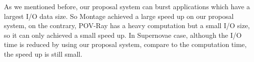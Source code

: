  As we mentioned before, our proposal system can burst applications which have a largest I/O data
 size.
 So Montage achieved a large speed up on our proposal system, on the contrary, POV-Ray has a heavy
 computation but a small I/O size, so it can only achieved a small speed up.
 In Supernovae case, although the I/O time is reduced by using our proposal system, compare to the
 computation time, the speed up is still small.
% 
% 
% 



